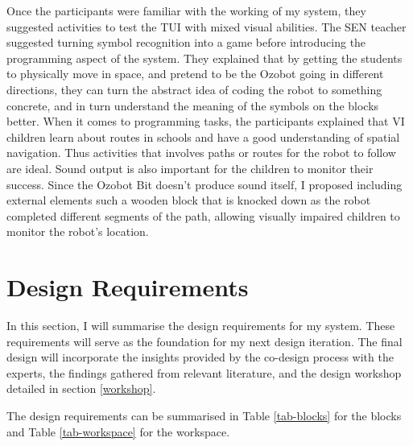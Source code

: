 \documentclass[oneside,%
                    author={Malak Hajji},
                    degree={BSc},
                    title={Designing An Accessible Ozobot Programming Platform for Students},
                  subtitle={With Mixed Visual Abilities}]{dissertation}
\begin{document}
Once the participants were familiar with the working of my system, they suggested activities to test the TUI with mixed visual abilities. The SEN teacher suggested turning symbol recognition into a game before introducing the programming aspect of the system. They explained that by getting the students to physically move in space, and pretend to be the Ozobot going in different directions, they can turn the abstract idea of coding the robot to something concrete, and in turn understand the meaning of the symbols on the blocks better. When it comes to programming tasks, the participants explained that VI children learn about routes in schools and have a good understanding of spatial navigation. Thus activities that involves paths or routes for the robot to follow are ideal. Sound output is also important for the children to monitor their success. Since the Ozobot Bit doesn't produce sound itself, I proposed including external elements such a wooden block that is knocked down as the robot completed different segments of the path, allowing visually impaired children to monitor the robot's location.

\section{Design Requirements}
\label{requirement}
In this section, I will summarise the design requirements for my system. These requirements will serve as the foundation for my next design iteration. The final design will incorporate the insights provided by the co-design process with the experts, the findings gathered from relevant literature, and the design workshop detailed in section \ref{workshop}.

The design requirements can be summarised in Table \ref{tab-blocks} for the blocks and Table \ref{tab-workspace} for the workspace.
\end{document}
